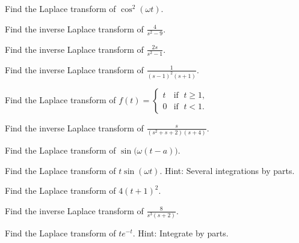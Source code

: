 \begin{exercise}
Find the Laplace transform of $\cos^2 (\omega t)$.
\end{exercise}

\begin{exercise}
Find the inverse Laplace transform of $\frac{4}{s^2-9}$.
\end{exercise}

\begin{exercise}
Find the inverse Laplace transform of $\frac{2s}{s^2-1}$.
\end{exercise}

\begin{exercise}
Find the inverse Laplace transform of $\frac{1}{{(s-1)}^2(s+1)}$.
\end{exercise}

\begin{exercise}
Find the Laplace transform of $f(t) =
\begin{cases}
t & \text{if } \; t \geq 1, \\
0 & \text{if } \; t < 1.
\end{cases}$
\end{exercise}

\begin{exercise}
Find the inverse Laplace transform of $\frac{s}{(s^2+s+2)(s+4)}$.
\end{exercise}

\begin{exercise}
Find the Laplace transform of $\sin\bigl(\omega (t-a)\bigr)$.
\end{exercise}

\begin{exercise}
Find the Laplace transform of $t\sin(\omega t)$.  Hint: Several integrations
by parts.
\end{exercise}

\setcounter{exercise}{100}

\begin{exercise}
Find the Laplace transform of $4{(t+1)}^2$.
\end{exercise}

\begin{exercise}
Find the inverse Laplace transform of $\frac{8}{s^3(s+2)}$.
\end{exercise}

\begin{exercise}
Find the Laplace transform of $te^{-t}$.  Hint: Integrate by parts.
\end{exercise}

